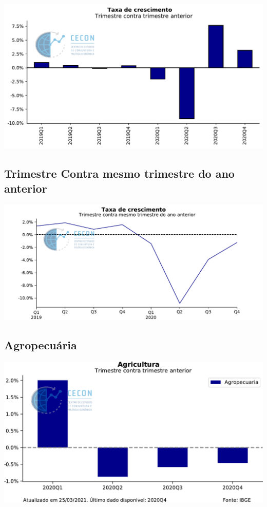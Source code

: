 \documentclass{SelfArx}
\begin{document}
\begin{center}
\includegraphics[width=.9\linewidth]{./figs/PIB/PIB.pdf}
\end{center}

\subsection*{Trimestre Contra mesmo trimestre do ano anterior}
\label{sec:org259c4ce}

\begin{center}
\includegraphics[width=.9\linewidth]{./figs/PIB/PIB_YoY.pdf}
\end{center}

\subsection*{Agropecuária}
\label{sec:org5455a42}

\begin{center}
\includegraphics[width=.9\linewidth]{./figs/PIB/Agropecuaria.pdf}
\end{center}
\end{document}
